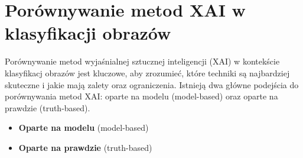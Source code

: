\section*{Porównywanie metod XAI w klasyfikacji obrazów}
Porównywanie metod wyjaśnialnej sztucznej inteligencji (XAI) w kontekście klasyfikacj obrazów jest kluczowe, aby zrozumieć, które techniki są najbardziej skuteczne i jakie mają zalety oraz ograniczenia.
Istnieją dwa główne podejścia do porównywania metod XAI: oparte na modelu (model-based) oraz oparte na prawdzie (truth-based).
\begin{itemize}
	\item \textbf{Oparte na modelu} (model-based)
	\item \textbf{Oparte na prawdzie} (truth-based)
\end{itemize}

